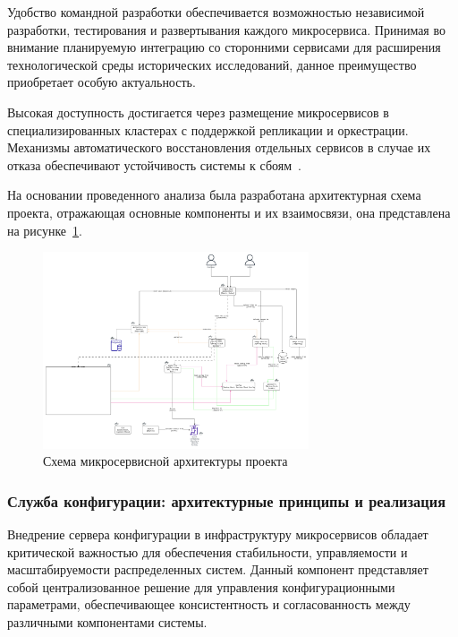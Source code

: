Удобство командной разработки обеспечивается возможностью независимой разработки, тестирования и развертывания каждого микросервиса. Принимая во внимание планируемую интеграцию со сторонними сервисами для расширения технологической среды исторических исследований, данное преимущество приобретает особую актуальность.

Высокая доступность достигается через размещение микросервисов в специализированных кластерах с поддержкой репликации и оркестрации. Механизмы автоматического восстановления отдельных сервисов в случае их отказа обеспечивают устойчивость системы к сбоям~\cite{16_schermann2016}.

На основании проведенного анализа была разработана архитектурная схема проекта, отражающая основные компоненты и их взаимосвязи, она представлена на рисунке~\ref{fig:microservices_schema}.

\begin{figure}[htbp]
    \centering
    \includegraphics[width=0.7\textwidth]{Dissertation/images/project_scheme}
    \caption{Схема микросервисной архитектуры проекта}
    \label{fig:microservices_schema}
\end{figure}

\subsubsection{Служба конфигурации: архитектурные принципы и реализация}

Внедрение сервера конфигурации в инфраструктуру микросервисов обладает критической важностью для обеспечения стабильности, управляемости и масштабируемости распределенных систем. Данный компонент представляет собой централизованное решение для управления конфигурационными параметрами, обеспечивающее консистентность и согласованность между различными компонентами системы.

